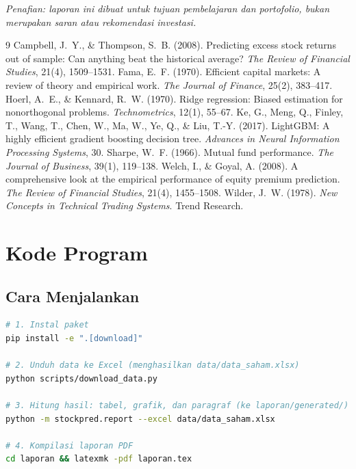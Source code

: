 \documentclass[11pt,a4paper]{article}
\begin{document}
\vspace{1em}
\noindent\small\textit{Penafian: laporan ini dibuat untuk tujuan pembelajaran dan portofolio,
bukan merupakan saran atau rekomendasi investasi.}
\normalsize

\begin{thebibliography}{9}
  Campbell, J.~Y., \& Thompson, S.~B. (2008). Predicting excess stock returns out of sample:
  Can anything beat the historical average? \emph{The Review of Financial Studies}, 21(4),
  1509--1531.
  Fama, E.~F. (1970). Efficient capital markets: A review of theory and empirical work.
  \emph{The Journal of Finance}, 25(2), 383--417.
  Hoerl, A.~E., \& Kennard, R.~W. (1970). Ridge regression: Biased estimation for
  nonorthogonal problems. \emph{Technometrics}, 12(1), 55--67.
  Ke, G., Meng, Q., Finley, T., Wang, T., Chen, W., Ma, W., Ye, Q., \& Liu, T.-Y. (2017).
  LightGBM: A highly efficient gradient boosting decision tree. \emph{Advances in Neural
  Information Processing Systems}, 30.
  Sharpe, W.~F. (1966). Mutual fund performance. \emph{The Journal of Business}, 39(1),
  119--138.
  Welch, I., \& Goyal, A. (2008). A comprehensive look at the empirical performance of
  equity premium prediction. \emph{The Review of Financial Studies}, 21(4), 1455--1508.
  Wilder, J.~W. (1978). \emph{New Concepts in Technical Trading Systems}. Trend Research.
\end{thebibliography}

\appendix
\section{Kode Program}
\label{sec:kode}

\subsection{Cara Menjalankan}
\begin{lstlisting}[language=bash,numbers=none]
# 1. Instal paket
pip install -e ".[download]"

# 2. Unduh data ke Excel (menghasilkan data/data_saham.xlsx)
python scripts/download_data.py

# 3. Hitung hasil: tabel, grafik, dan paragraf (ke laporan/generated/)
python -m stockpred.report --excel data/data_saham.xlsx

# 4. Kompilasi laporan PDF
cd laporan && latexmk -pdf laporan.tex
\end{lstlisting}
\end{document}
